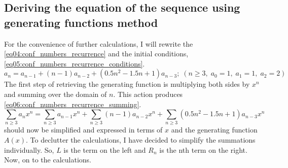 \documentclass[stu, 11pt, a4paper, floatsintext]{apa7}
\begin{document}
	\subsection{Deriving the equation of the sequence using generating functions method}
	For the convenience of further calculations, I will rewrite the \cref{eq04:conf_numbers_recurrence} and the initial conditions, \cref{eq05:conf_numbers_recurrence_conditions}.
	\begin{equation}
		\label{eq05:conf_numbers_recurrence_conditions}
		a_n=a_{n-1}+(n-1)a_{n-2}+(0.5n^2-1.5n+1)a_{n-3};\;(n\geq3,\;a_0=1,\;a_1=1,\;a_2=2)
	\end{equation}
	The first step of retrieving the generating function is multiplying both sides by $x^n$ and summing over the domain of $n$. This action produces \cref{eq06:conf_numbers_recurrence_summing}.
	\begin{equation}
		\label{eq06:conf_numbers_recurrence_summing}
		\sum_{n\geq 3} a_nx^n=\sum_{n\geq 3} a_{n-1}x^n+\sum_{n\geq 3} (n-1)a_{n-2}x^n+\sum_{n\geq 3} (0.5n^2-1.5n+1)a_{n-3}x^n
	\end{equation}
	 should now be simplified and expressed in terms of $x$ and the generating function $A(x)$. To declutter the calculations, I have decided to simplify the summations individually. So, $L$ is the term on the left and $R_n$ is the nth term on the right. Now, on to the calculations.
\end{document}
